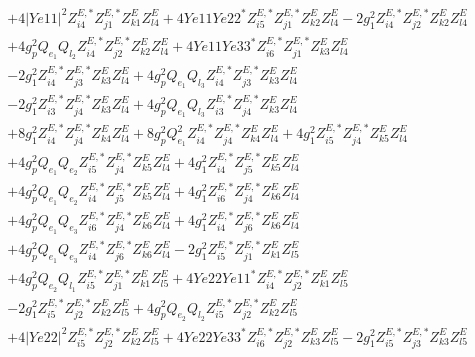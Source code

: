 \begin{align}
 &+4 |Ye11|^2 Z^{E,*}_{i 4} Z^{E,*}_{j 1} Z_{{k 1}}^{E} Z_{{l 4}}^{E} +4 Ye11 Ye22^* Z^{E,*}_{i 5} Z^{E,*}_{j 1} Z_{{k 2}}^{E} Z_{{l 4}}^{E} -2 g_{1}^{2} Z^{E,*}_{i 4} Z^{E,*}_{j 2} Z_{{k 2}}^{E} Z_{{l 4}}^{E} \nonumber \\ 
 &+4 g_{p}^{2} Q_{e_{1}} Q_{l_2} Z^{E,*}_{i 4} Z^{E,*}_{j 2} Z_{{k 2}}^{E} Z_{{l 4}}^{E} +4 Ye11 Ye33^* Z^{E,*}_{i 6} Z^{E,*}_{j 1} Z_{{k 3}}^{E} Z_{{l 4}}^{E} \nonumber \\ 
 &-2 g_{1}^{2} Z^{E,*}_{i 4} Z^{E,*}_{j 3} Z_{{k 3}}^{E} Z_{{l 4}}^{E} +4 g_{p}^{2} Q_{e_{1}} Q_{l_3} Z^{E,*}_{i 4} Z^{E,*}_{j 3} Z_{{k 3}}^{E} Z_{{l 4}}^{E} \nonumber \\ 
 &-2 g_{1}^{2} Z^{E,*}_{i 3} Z^{E,*}_{j 4} Z_{{k 3}}^{E} Z_{{l 4}}^{E} +4 g_{p}^{2} Q_{e_{1}} Q_{l_3} Z^{E,*}_{i 3} Z^{E,*}_{j 4} Z_{{k 3}}^{E} Z_{{l 4}}^{E} \nonumber \\ 
 &+8 g_{1}^{2} Z^{E,*}_{i 4} Z^{E,*}_{j 4} Z_{{k 4}}^{E} Z_{{l 4}}^{E} +8 g_{p}^{2} Q_{e_{1}}^{2} Z^{E,*}_{i 4} Z^{E,*}_{j 4} Z_{{k 4}}^{E} Z_{{l 4}}^{E} +4 g_{1}^{2} Z^{E,*}_{i 5} Z^{E,*}_{j 4} Z_{{k 5}}^{E} Z_{{l 4}}^{E} \nonumber \\ 
 &+4 g_{p}^{2} Q_{e_{1}} Q_{e_{2}} Z^{E,*}_{i 5} Z^{E,*}_{j 4} Z_{{k 5}}^{E} Z_{{l 4}}^{E} +4 g_{1}^{2} Z^{E,*}_{i 4} Z^{E,*}_{j 5} Z_{{k 5}}^{E} Z_{{l 4}}^{E} \nonumber \\ 
 &+4 g_{p}^{2} Q_{e_{1}} Q_{e_{2}} Z^{E,*}_{i 4} Z^{E,*}_{j 5} Z_{{k 5}}^{E} Z_{{l 4}}^{E} +4 g_{1}^{2} Z^{E,*}_{i 6} Z^{E,*}_{j 4} Z_{{k 6}}^{E} Z_{{l 4}}^{E} \nonumber \\ 
 &+4 g_{p}^{2} Q_{e_{1}} Q_{e_3} Z^{E,*}_{i 6} Z^{E,*}_{j 4} Z_{{k 6}}^{E} Z_{{l 4}}^{E} +4 g_{1}^{2} Z^{E,*}_{i 4} Z^{E,*}_{j 6} Z_{{k 6}}^{E} Z_{{l 4}}^{E} \nonumber \\ 
 &+4 g_{p}^{2} Q_{e_{1}} Q_{e_3} Z^{E,*}_{i 4} Z^{E,*}_{j 6} Z_{{k 6}}^{E} Z_{{l 4}}^{E} -2 g_{1}^{2} Z^{E,*}_{i 5} Z^{E,*}_{j 1} Z_{{k 1}}^{E} Z_{{l 5}}^{E} \nonumber \\ 
 &+4 g_{p}^{2} Q_{e_{2}} Q_{l_1} Z^{E,*}_{i 5} Z^{E,*}_{j 1} Z_{{k 1}}^{E} Z_{{l 5}}^{E} +4 Ye22 Ye11^* Z^{E,*}_{i 4} Z^{E,*}_{j 2} Z_{{k 1}}^{E} Z_{{l 5}}^{E} \nonumber \\ 
 &-2 g_{1}^{2} Z^{E,*}_{i 5} Z^{E,*}_{j 2} Z_{{k 2}}^{E} Z_{{l 5}}^{E} +4 g_{p}^{2} Q_{e_{2}} Q_{l_2} Z^{E,*}_{i 5} Z^{E,*}_{j 2} Z_{{k 2}}^{E} Z_{{l 5}}^{E} \nonumber \\ 
 &+4 |Ye22|^2 Z^{E,*}_{i 5} Z^{E,*}_{j 2} Z_{{k 2}}^{E} Z_{{l 5}}^{E} +4 Ye22 Ye33^* Z^{E,*}_{i 6} Z^{E,*}_{j 2} Z_{{k 3}}^{E} Z_{{l 5}}^{E} -2 g_{1}^{2} Z^{E,*}_{i 5} Z^{E,*}_{j 3} Z_{{k 3}}^{E} Z_{{l 5}}^{E} \nonumber \\ 

\end{align}
